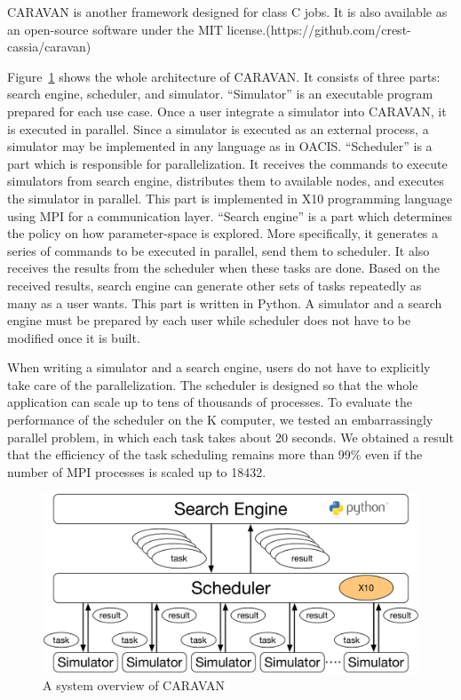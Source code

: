 CARAVAN is another framework designed for class C jobs.
It is also available as an open-source software under the MIT license.(https://github.com/crest-cassia/caravan)

Figure~\ref{fig:caravan_overview} shows the whole architecture of CARAVAN. It consists of three parts: search engine, scheduler, and simulator.
``Simulator'' is an executable program prepared for each use case. Once a user integrate a simulator into CARAVAN, it is executed in parallel.
Since a simulator is executed as an external process, a simulator may be implemented in any language as in OACIS.
``Scheduler'' is a part which is responsible for parallelization. It receives the commands to execute simulators from search engine, distributes them to available nodes, and executes the simulator in parallel.
This part is implemented in X10 programming language using MPI for a communication layer.
``Search engine'' is a part which determines the policy on how parameter-space is explored.
More specifically, it generates a series of commands to be executed in parallel, send them to scheduler.
It also receives the results from the scheduler when these tasks are done.
Based on the received results, search engine can generate other sets of tasks repeatedly as many as a user wants.
This part is written in Python.
A simulator and a search engine must be prepared by each user while scheduler does not have to be modified once it is built.

When writing a simulator and a search engine, users do not have to explicitly take care of the parallelization.
The scheduler is designed so that the whole application can scale up to tens of thousands of processes.
To evaluate the performance of the scheduler on the K computer, we tested an embarrassingly parallel problem, in which each task takes about 20 seconds.
We obtained a result that the efficiency of the task scheduling remains more than 99\% even if the number of MPI processes is scaled up to 18432.

\begin{figure}
  \centering
  \includegraphics[width=.8\linewidth]{Figs.murase/caravan_overview.pdf}
  \caption{A system overview of CARAVAN}
  \label{fig:caravan_overview}
\end{figure}

